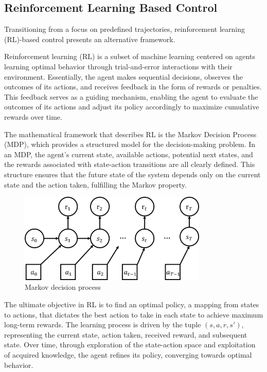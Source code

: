 \subsection{Reinforcement Learning Based Control}
Transitioning from a focus on predefined trajectories, reinforcement learning (RL)-based control presents an alternative framework.

Reinforcement learning (RL) is a subset of machine learning centered on agents learning optimal behavior through trial-and-error interactions with their environment. Essentially, the agent makes sequential decisions, observes the outcomes of its actions, and receives feedback in the form of rewards or penalties. This feedback serves as a guiding mechanism, enabling the agent to evaluate the outcomes of its actions and adjust its policy accordingly to maximize cumulative rewards over time.

The mathematical framework that describes RL is the Markov Decision Process (MDP), which provides a structured model for the decision-making problem. In an MDP, the agent's current state, available actions, potential next states, and the rewards associated with state-action transitions are all clearly defined. This structure ensures that the future state of the system depends only on the current state and the action taken, fulfilling the Markov property.

\begin{figure}[h]
    \centering
    \includegraphics[width=0.8\textwidth]{figures/MDP.png}
    \caption{Markov decision process}
    \label{fig:mdp}
\end{figure}

The ultimate objective in RL is to find an optimal policy, a mapping from states to actions, that dictates the best action to take in each state to achieve maximum long-term rewards. The learning process is driven by the tuple \((s,a,r,s')\), representing the current state, action taken, received reward, and subsequent state. Over time, through exploration of the state-action space and exploitation of acquired knowledge, the agent refines its policy, converging towards optimal behavior.

